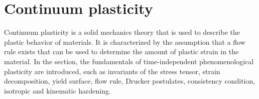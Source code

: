 

\section{Continuum plasticity}
\noindent
Continuum plasticity is a solid mechanics theory that is used to describe the plastic behavior of materials.
It is characterized by the assumption that a flow rule exists that can be used to determine the amount of plastic strain in the material.
In the section, the fundamentals of time-independent phenomenological plasticity are introduced, such as invariants of the stress tensor, strain decomposition, yield surface, flow rule, Drucker postulates, consistency condition, isotropic and kinematic hardening.

